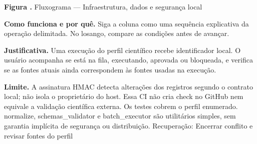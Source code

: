 {\small\textbf{Figura \thefigure.} Fluxograma --- Infraestrutura, dados e segurança local}\par\smallskip
\noindent\textbf{Como funciona e por quê.} Siga a coluna como uma sequência explicativa da operação delimitada. No losango, compare as condições antes de avançar.\par
\noindent\textbf{Justificativa.} Uma execução do perfil científico recebe identificador local. O usuário acompanha se está na fila, executando, aprovada ou bloqueada, e verifica se as fontes atuais ainda correspondem às fontes usadas na execução.\par
\noindent\textbf{Limite.} A assinatura HMAC detecta alterações dos registros segundo o contrato local; não isola o proprietário do host. Essa CI não cria check no GitHub nem equivale a validação científica externa. Os testes cobrem o perfil enumerado. normalize, schemas\_validator e batch\_executor são utilitários simples, sem garantia implícita de segurança ou distribuição. Recuperação: Encerrar conflito e revisar fontes do perfil\par\smallskip
{}

